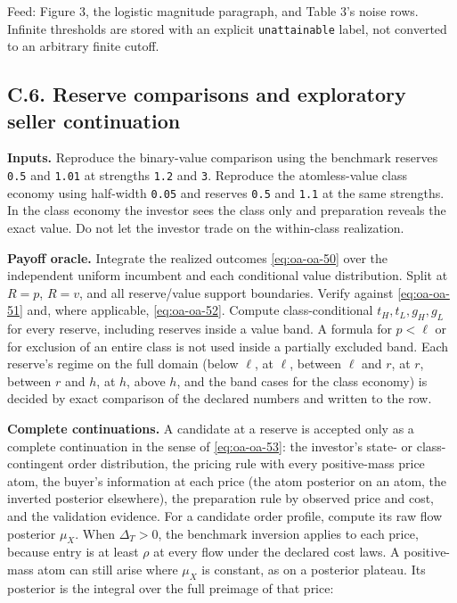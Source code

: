 \documentclass[
  11pt,
]{article}
\begin{document}
Feed: Figure 3, the logistic magnitude paragraph, and Table 3's noise
rows. Infinite thresholds are stored with an explicit
\texttt{unattainable} label, not converted to an arbitrary finite
cutoff.

\subsection{C.6. Reserve comparisons and exploratory seller
continuation}\label{oa-c-reserve}

\textbf{Inputs.} Reproduce the binary-value comparison using the
benchmark reserves \texttt{0.5} and \texttt{1.01} at strengths
\texttt{1.2} and \texttt{3}. Reproduce the atomless-value class economy
using half-width \texttt{0.05} and reserves \texttt{0.5} and
\texttt{1.1} at the same strengths. In the class economy the investor
sees the class only and preparation reveals the exact value. Do not let
the investor trade on the within-class realization.

\textbf{Payoff oracle.} Integrate the realized outcomes
\eqref{eq:oa-oa-50} over the independent uniform incumbent and each
conditional value distribution. Split at \(R=p\), \(R=v\), and all
reserve/value support boundaries. Verify against \eqref{eq:oa-oa-51}
and, where applicable, \eqref{eq:oa-oa-52}. Compute class-conditional
\(t_H,t_L,g_H,g_L\) for every reserve, including reserves inside a value
band. A formula for \(p<\ell\) or for exclusion of an entire class is
not used inside a partially excluded band. Each reserve's regime on the
full domain (below \(\ell\), at \(\ell\), between \(\ell\) and \(r\), at
\(r\), between \(r\) and \(h\), at \(h\), above \(h\), and the band
cases for the class economy) is decided by exact comparison of the
declared numbers and written to the row.

\textbf{Complete continuations.} A candidate at a reserve is accepted
only as a complete continuation in the sense of \eqref{eq:oa-oa-53}: the
investor's state- or class-contingent order distribution, the pricing
rule with every positive-mass price atom, the buyer's information at
each price (the atom posterior on an atom, the inverted posterior
elsewhere), the preparation rule by observed price and cost, and the
validation evidence. For a candidate order profile, compute its raw flow
posterior \(\mu_X\). When \(\Delta_T>0\), the benchmark inversion applies to
each price, because entry is at least \(\rho\) at every flow under the
declared cost laws. A positive-mass atom can still arise where \(\mu_X\) is
constant, as on a posterior plateau. Its posterior is the integral over the
full preimage of that price:
\end{document}
